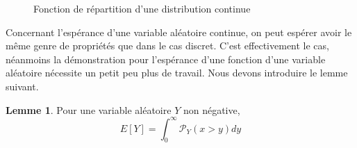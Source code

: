 \documentclass[a4paper,12pt]{report}
\theoremstyle{definition}
\renewcommand{\(}{\left(}
\renewcommand{\)}{\right)}
\renewcommand{\P}{\mathcal{P}}
\newtheorem{lemme}[thm]{Lemme}
\begin{document}
            \begin{figure}[H]
                \centering
                \caption{Fonction de répartition d'une distribution continue}
            \end{figure}
        
            Concernant l'espérance d'une variable aléatoire continue, on peut espérer avoir le même genre de propriétés que dans le cas discret. C'est effectivement le cas, néanmoins la démonstration pour l'espérance d'une fonction d'une variable aléatoire nécessite un petit peu plus de travail. Nous devons introduire le lemme suivant.
            
            \begin{leftbar}
            \begin{lemme}
                Pour une variable aléatoire $Y$ non négative, 
                $$E[Y] = \displaystyle{\int_0^{\infty} \P_Y(x >y)dy}$$
            \end{lemme}
            \end{leftbar}
            
\end{document}
